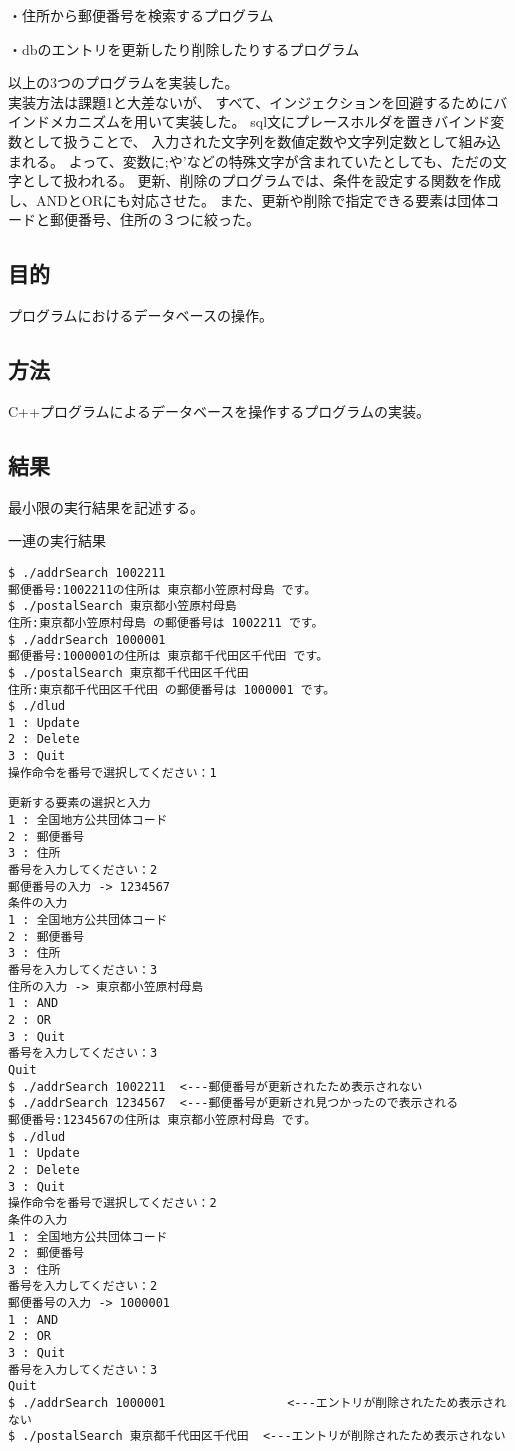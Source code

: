 \documentclass[a4j]{jarticle}
\begin{document}
・住所から郵便番号を検索するプログラム

・dbのエントリを更新したり削除したりするプログラム

以上の3つのプログラムを実装した。\\
実装方法は課題1と大差ないが、
すべて、インジェクションを回避するためにバインドメカニズムを用いて実装した。
sql文にプレースホルダを置きバインド変数として扱うことで、
入力された文字列を数値定数や文字列定数として組み込まれる。
よって、変数に;や'などの特殊文字が含まれていたとしても、ただの文字として扱われる。
更新、削除のプログラムでは、条件を設定する関数を作成し、ANDとORにも対応させた。
また、更新や削除で指定できる要素は団体コードと郵便番号、住所の３つに絞った。

\subsection{目的}
プログラムにおけるデータベースの操作。

\subsection{方法}
C++プログラムによるデータベースを操作するプログラムの実装。

\subsection{結果}
最小限の実行結果を記述する。
\begin{itembox}{一連の実行結果}
\begin{verbatim}
$ ./addrSearch 1002211
郵便番号:1002211の住所は 東京都小笠原村母島 です。
$ ./postalSearch 東京都小笠原村母島
住所:東京都小笠原村母島 の郵便番号は 1002211 です。
$ ./addrSearch 1000001
郵便番号:1000001の住所は 東京都千代田区千代田 です。
$ ./postalSearch 東京都千代田区千代田
住所:東京都千代田区千代田 の郵便番号は 1000001 です。
$ ./dlud 
1 : Update
2 : Delete
3 : Quit
操作命令を番号で選択してください：1
\end{verbatim}
\end{itembox}
\begin{screen}
\begin{verbatim}
更新する要素の選択と入力
1 : 全国地方公共団体コード
2 : 郵便番号
3 : 住所
番号を入力してください：2
郵便番号の入力 -> 1234567
条件の入力
1 : 全国地方公共団体コード
2 : 郵便番号
3 : 住所
番号を入力してください：3
住所の入力 -> 東京都小笠原村母島
1 : AND
2 : OR
3 : Quit
番号を入力してください：3
Quit
$ ./addrSearch 1002211  <---郵便番号が更新されたため表示されない
$ ./addrSearch 1234567  <---郵便番号が更新され見つかったので表示される
郵便番号:1234567の住所は 東京都小笠原村母島 です。
$ ./dlud 
1 : Update
2 : Delete
3 : Quit
操作命令を番号で選択してください：2
条件の入力
1 : 全国地方公共団体コード
2 : 郵便番号
3 : 住所
番号を入力してください：2
郵便番号の入力 -> 1000001
1 : AND
2 : OR
3 : Quit
番号を入力してください：3
Quit
$ ./addrSearch 1000001                 <---エントリが削除されたため表示されない
$ ./postalSearch 東京都千代田区千代田  <---エントリが削除されたため表示されない
\end{verbatim}
\end{screen}
\end{document}
